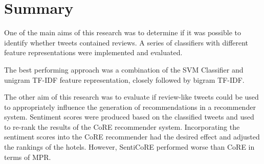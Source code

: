 \section{Summary}

One of the main aims of this research was to determine if it was possible to identify whether tweets contained reviews. A series of classifiers with different feature representations were implemented and evaluated. 

The best performing approach was a combination of the SVM Classifier and unigram TF-IDF feature representation, closely followed by bigram TF-IDF. 

The other aim of this research was to evaluate if review-like tweets could be used to appropriately influence the generation of recommendations in a recommender system. Sentiment scores were produced based on the classified tweets and used to re-rank the results of the CoRE recommender system. Incorporating the sentiment scores into the CoRE recommender had the desired effect and adjusted the rankings of the hotels. However, SentiCoRE performed worse than CoRE in terms of MPR.

